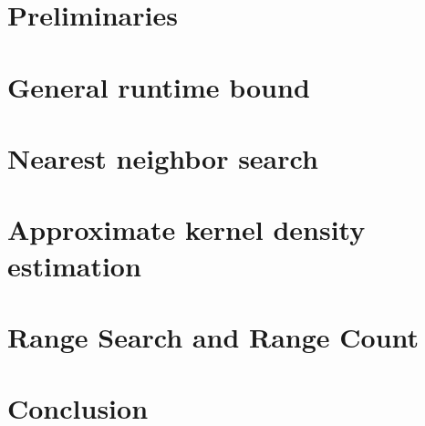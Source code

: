 \documentclass{article} %
\begin{document}

\section{Preliminaries}



\section{General runtime bound}



\section{Nearest neighbor search}



\section{Approximate kernel density estimation}



\section{Range Search and Range Count}




%

\section{Conclusion}






\appendix

\end{document}
